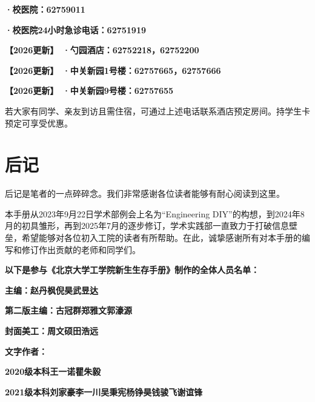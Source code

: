 \documentclass[11pt,oneside]{book}
\newcommand{\updateMark}{\textcolor{chaph}{\textbf{【2026更新】}}\ }
\begin{document}
\vspace{10pt}

\textbf{·校医院：62759011}

\textbf{·校医院24小时急诊电话：62751919}

\vspace{10pt}

\updateMark\textbf{·勺园酒店：62752218，62752200}

\updateMark\textbf{·中关新园1号楼：62757665，62757666}

\updateMark\textbf{·中关新园9号楼：62757655}

若大家有同学、亲友到访且需住宿，可通过上述电话联系酒店预定房间。持学生卡预定可享受优惠。

\backmatter

\chapter*{后记}
后记是笔者的一点碎碎念。我们非常感谢各位读者能够有耐心阅读到这里。

\vspace{10pt}

本手册从2023年9月22日学术部例会上名为“Engineering DIY”的构想，到2024年8月的初具雏形，再到2025年7月的逐步修订，学术实践部一直致力于打破信息壁垒，希望能够对各位初入工院的读者有所帮助。在此，诚挚感谢所有对本手册的编写和修订作出贡献的老师和同学们。

\vspace{10pt}

\textbf{以下是参与《北京大学工学院新生生存手册》制作的全体人员名单：}

\textbf{主编：赵丹枫\hspace{6pt}倪\hspace{11pt}昊\hspace{6pt}武昱达}

\textbf{第二版主编：古冠群\hspace{6pt}郑雅文\hspace{6pt}郭濠源}

\textbf{封面美工：周文硕\hspace{6pt}田浩远}

\textbf{文字作者：}

\textbf{2020级本科\hspace{20pt}王一诺\hspace{6pt}瞿朱毅}

\textbf{2021级本科\hspace{20pt}刘家豪\hspace{6pt}李一川\hspace{6pt}吴秉宪\hspace{6pt}杨铮昊\hspace{6pt}钱骏飞\hspace{6pt}谢谊锋}
\end{document}
